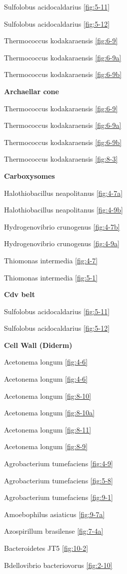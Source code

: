 \documentclass[]{tufte-book}
\begin{document}
Sulfolobus acidocaldarius \ref{fig:5-11}

Sulfolobus acidocaldarius \ref{fig:5-12}

Thermococcus kodakaraensis \ref{fig:6-9}

Thermococcus kodakaraensis \ref{fig:6-9a}

Thermococcus kodakaraensis \ref{fig:6-9b}

\textbf{Archaellar cone}

Thermococcus kodakaraensis \ref{fig:6-9}

Thermococcus kodakaraensis \ref{fig:6-9a}

Thermococcus kodakaraensis \ref{fig:6-9b}

Thermococcus kodakaraensis \ref{fig:8-3}

\textbf{Carboxysomes}

Halothiobacillus neapolitanus \ref{fig:4-7a}

Halothiobacillus neapolitanus \ref{fig:4-9b}

Hydrogenovibrio crunogenus \ref{fig:4-7b}

Hydrogenovibrio crunogenus \ref{fig:4-9a}

Thiomonas intermedia \ref{fig:4-7}

Thiomonas intermedia \ref{fig:5-1}

\textbf{Cdv belt}

Sulfolobus acidocaldarius \ref{fig:5-11}

Sulfolobus acidocaldarius \ref{fig:5-12}

\textbf{Cell Wall (Diderm)}

Acetonema longum \ref{fig:4-6}

Acetonema longum \ref{fig:4-6}

Acetonema longum \ref{fig:8-10}

Acetonema longum \ref{fig:8-10a}

Acetonema longum \ref{fig:8-11}

Acetonema longum \ref{fig:8-9}

Agrobacterium tumefaciens \ref{fig:4-9}

Agrobacterium tumefaciens \ref{fig:5-8}

Agrobacterium tumefaciens \ref{fig:9-1}

Amoebophilus asiaticus \ref{fig:9-7a}

Azospirillum brasilense \ref{fig:7-4a}

Bacteroidetes JT5 \ref{fig:10-2}

Bdellovibrio bacteriovorus \ref{fig:2-10}
\end{document}
